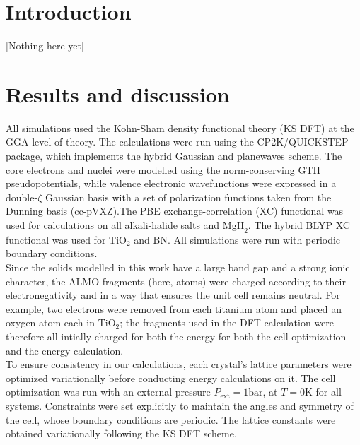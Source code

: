 \documentclass[aps,prb,twocolumn,amsmath,amssymb,superscriptaddress,longbibliography]{revtex4-1}
\begin{document}
\section{Introduction} 

[Nothing here yet]



\section*{Results and discussion}
 
All simulations used the Kohn-Sham density functional theory (KS DFT) at the GGA level of theory. The calculations were run using the CP2K/QUICKSTEP package\cite{cp2k}, which implements the hybrid Gaussian and planewaves scheme\cite{gpw}. The core electrons and nuclei were modelled using the norm-conserving GTH pseudopotentials\cite{gth1,gth2}, while valence electronic wavefunctions were expressed in a $\text{double-}\zeta$  Gaussian basis \cite{gaussian} with a set of polarization functions taken from the Dunning basis (cc-pVXZ)\cite{pol,qs}.The PBE exchange-correlation (XC) functional\cite{pbe} was used for calculations on all alkali-halide salts and $\text{MgH}_{2}$. The hybrid BLYP XC functional\cite{becke,lyp} was used for $\text{TiO}_{2}$ and BN. All simulations were run with periodic boundary conditions.\\

Since the solids modelled in this work have a large band gap and a strong ionic character, the ALMO fragments (here, atoms) were charged according to their electronegativity and in a way that ensures the unit cell remains neutral. For example, two electrons were removed from each titanium atom and placed an oxygen atom each in $\text{TiO}_{2}$; the fragments used in the DFT calculation were therefore all intially charged for both the energy for both the cell optimization and the energy calculation.\\  


To ensure consistency in our calculations, each crystal's lattice parameters were optimized variationally before conducting energy calculations on it.  The cell optimization was run with an external pressure $P_{\text{ext}} = 1 \text{bar}$, at $T = 0 \text{K}$ for all systems. Constraints were set explicitly to maintain the angles and symmetry of the cell, whose boundary conditions are periodic. The lattice constants were obtained variationally following the KS DFT scheme.\\ 
\end{document}
